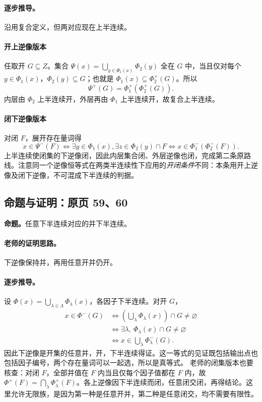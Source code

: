 \documentclass[11pt,a4paper]{article}
\theoremstyle{definition}\newtheorem{definition}{定义}\newtheorem{example}{例}
\begin{document}
\paragraph{逐步推导。}
沿用复合定义，但两对应现在上半连续。
\paragraph{开上逆像版本}任取开 $G\subseteq Z$。集合 $\Psi(x)=\bigcup_{y\in\Phi_1(x)}\Phi_2(y)$ 全在 $G$ 中，当且仅对每个 $y\in\Phi_1(x)$，$\Phi_2(y)\subseteq G$；也就是 $\Phi_1(x)\subseteq\Phi_2^+(G)$。所以
\[\Psi^+(G)=\Phi_1^+(\Phi_2^+(G)).\]
内层由 $\Phi_2$ 上半连续开，外层再由 $\Phi_1$ 上半连续开，故复合上半连续。
\paragraph{闭下逆像版本}对闭 $F$，展开存在量词得
\[x\in\Psi^-(F)\iff\exists y\in\Phi_1(x),\exists z\in\Phi_2(y)\cap F\iff x\in\Phi_1^-(\Phi_2^-(F)).\]
上半连续使闭集的下逆像闭，因此内层集合闭、外层逆像也闭，完成第二条原路线。注意同一个逆像恒等式在两类半连续性下应用的\emph{开闭条件}不同：本条用开上逆像及闭下逆像，不可混成下半连续的判据。


\subsection{命题与证明：原页 59、60}

\textbf{命题。}任意下半连续对应的并下半连续。

\paragraph{老师的证明思路。}下逆像保持并，再用任意开并仍开。

\paragraph{逐步推导。}
设 $\Phi(x)=\bigcup_{\lambda\in\Lambda}\Phi_\lambda(x)$，各因子下半连续。对开 $G$，
\begin{align*}
x\in\Phi^-(G)&\iff\left(\bigcup_\lambda\Phi_\lambda(x)\right)\cap G\ne\varnothing\\
&\iff\exists\lambda,\ \Phi_\lambda(x)\cap G\ne\varnothing\\
&\iff x\in\bigcup_\lambda\Phi_\lambda^-(G).
\end{align*}
因此下逆像是开集的任意并，开，下半连续得证。这一等式的见证既包括输出点也包括因子编号，两个存在量词可以一起选，所以是真等式。
老师的闭集版本也要核查：对闭 $F$，全部并值在 $F$ 内当且仅每个因子值都在 $F$ 内，故 $\Phi^+(F)=\bigcap_\lambda\Phi_\lambda^+(F)$。各上逆像因下半连续而闭，任意闭交闭，再得结论。这里允许无限族，是因为第一种是任意开并，第二种是任意闭交，均不需要有限性。
\end{document}
